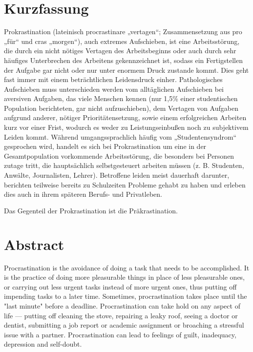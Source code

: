 \section*{Kurzfassung}

Prokrastination (lateinisch procrastinare „vertagen“; Zusammensetzung aus pro „für“ und cras „morgen“),
auch extremes Aufschieben, ist eine Arbeitsstörung, die durch ein nicht nötiges Vertagen des Arbeitsbeginns 
oder auch durch sehr häufiges Unterbrechen des Arbeitens gekennzeichnet ist, sodass ein Fertigstellen der 
Aufgabe gar nicht oder nur unter enormem Druck zustande kommt. Dies geht fast immer mit einem beträchtlichen 
Leidensdruck einher. Pathologisches Aufschieben muss unterschieden werden vom alltäglichen Aufschieben bei
aversiven Aufgaben, das viele Menschen kennen (nur 1,5\% einer studentischen Population berichteten, gar 
nicht aufzuschieben), dem Vertagen von Aufgaben aufgrund anderer, nötiger Prioritätensetzung, sowie einem 
erfolgreichen Arbeiten kurz vor einer Frist, wodurch es weder zu Leistungseinbußen noch zu subjektivem Leiden 
kommt. Während umgangssprachlich häufig vom „Studentensyndrom“ gesprochen wird, handelt es sich bei 
Prokrastination um eine in der Gesamtpopulation vorkommende Arbeitsstörung, die besonders bei Personen 
zutage tritt, die hauptsächlich selbstgesteuert arbeiten müssen (z. B. Studenten, Anwälte, Journalisten,
Lehrer). Betroffene leiden meist dauerhaft darunter, berichten teilweise bereits zu Schulzeiten Probleme 
gehabt zu haben und erleben dies auch in ihrem späteren Berufs- und Privatleben.

Das Gegenteil der Prokrastination ist die Präkrastination\cite{kuenzel:2014}.

%
\vskip 3cm
%

\section*{Abstract}

Procrastination is the avoidance of doing a task that needs to be accomplished\cite{9781111987251}. It 
is the practice of doing more pleasurable things in place of less pleasurable ones, or carrying out less 
urgent tasks instead of more urgent ones, thus putting off impending tasks to a later time. Sometimes, 
procrastination takes place until the "last minute" before a deadline. Procrastination can take hold on
any aspect of life — putting off cleaning the stove, repairing a leaky roof, seeing a doctor or dentist,
submitting a job report or academic assignment or broaching a stressful issue with a partner. 
Procrastination can lead to feelings of guilt, inadequacy, depression and self-doubt.



